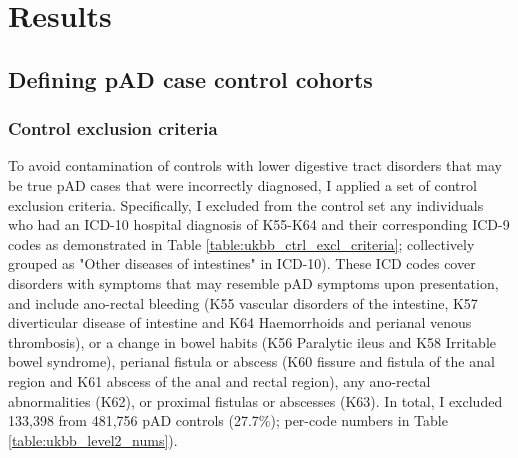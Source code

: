 \section{Results}


\subsection{Defining pAD case control cohorts}


\subsubsection{Control exclusion criteria}
To avoid contamination of controls with lower digestive tract disorders that may be true pAD cases that were incorrectly diagnosed, I applied a set of control exclusion criteria. Specifically, I excluded from the control set any individuals who had an ICD-10 hospital diagnosis of K55-K64 and their corresponding ICD-9 codes as demonstrated in Table \ref{table:ukbb_ctrl_excl_criteria}; collectively grouped as "Other diseases of intestines" in ICD-10). These ICD codes cover disorders with symptoms that may resemble pAD symptoms upon presentation, and include ano-rectal bleeding (K55 vascular disorders of the intestine, K57 diverticular disease of intestine and K64 Haemorrhoids and perianal venous thrombosis), or a change in bowel habits (K56 Paralytic ileus and K58 Irritable bowel syndrome), perianal fistula or abscess (K60 fissure and fistula of the anal region and K61 abscess of the anal and rectal region), any ano-rectal abnormalities (K62), or proximal fistulas or abscesses (K63). In total, I excluded 133,398 from 481,756 pAD controls (27.7\%); per-code numbers in Table \ref{table:ukbb_level2_nums}).


